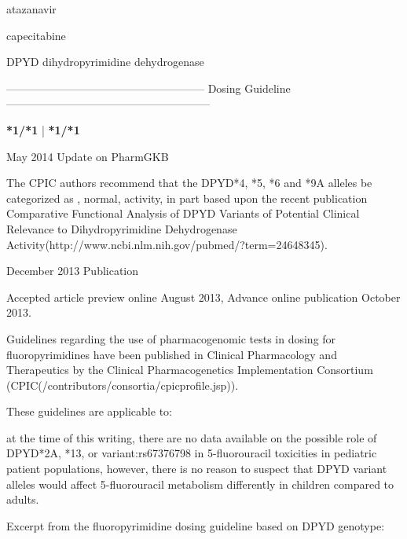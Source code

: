 \documentclass{resume} %
\begin{document}
\begin{rSection}{ atazanavir }
\end{rSection}\begin{rSection}{ capecitabine }
\item[]
\begin{rSubsection}{ DPYD }{ dihydropyrimidine dehydrogenase }{}{}
\item[]
\item[] ------------------------------------------------------ Dosing Guideline --------------------------------------------------------\newline
\item[]
\item[] \textbf{ *1/*1 } | \textbf{ *1/*1 }
\item May 2014 Update on PharmGKB
 \newline
\item The CPIC authors recommend that the DPYD*4, *5, *6 and *9A alleles be categorized as , normal,  activity, in part based upon the recent publication Comparative Functional Analysis of DPYD Variants of Potential Clinical Relevance to Dihydropyrimidine Dehydrogenase Activity(http://www.ncbi.nlm.nih.gov/pubmed/?term=24648345). 
 \newline
\item December 2013 Publication
 \newline
\item Accepted article preview online August 2013,  Advance online publication October 2013.
 \newline
\item Guidelines regarding the use of pharmacogenomic tests in dosing for fluoropyrimidines have been published in Clinical Pharmacology and Therapeutics by the Clinical Pharmacogenetics Implementation Consortium (CPIC(/contributors/consortia/cpicprofile.jsp)).
 \newline
\item These guidelines are applicable to:
 \newline
\item at the time of this writing, there are no data available on the possible role of DPYD*2A, *13, or variant:rs67376798 in 5-fluorouracil toxicities in pediatric patient populations,  however, there is no reason to suspect that DPYD variant alleles would affect 5-fluorouracil metabolism differently in children compared to adults.
 \newline
\item Excerpt from the fluoropyrimidine dosing guideline based on DPYD genotype:
 \newline

\end{rSubsection}
\end{rSection}
\end{document}

